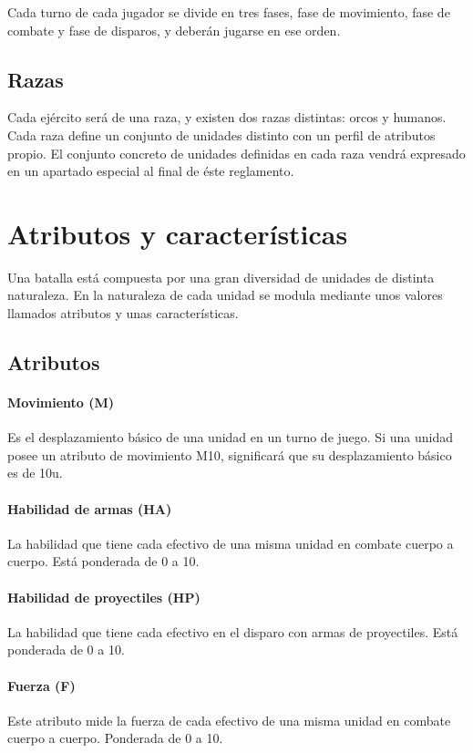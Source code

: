 Cada turno de cada jugador se divide en tres fases, fase de
movimiento, fase de combate y fase de disparos, y deberán jugarse en ese orden. 

\subsection*{Razas}
Cada ejército será de una raza, y existen dos razas distintas: orcos y
humanos. Cada raza define un conjunto de unidades distinto con un
perfil de atributos propio. El conjunto concreto de unidades definidas
en cada raza vendrá expresado en un apartado especial al final de éste
reglamento.


\section*{Atributos y características}
\label{atributos}
Una batalla está compuesta por una gran diversidad de unidades de distinta naturaleza. En \GoM la naturaleza de cada unidad se modula mediante unos valores llamados atributos y unas características. 

\subsection*{Atributos}
\paragraph{Movimiento (M)}
Es el desplazamiento básico de una unidad en un turno de juego. Si una unidad posee un atributo de movimiento M10, significará que su desplazamiento básico es de 10u.

\paragraph{Habilidad de armas (HA)}
La habilidad que tiene cada efectivo de una misma unidad en combate
cuerpo a cuerpo. Está ponderada de 0 a 10. 

\paragraph{Habilidad de proyectiles (HP)}
La habilidad que tiene cada efectivo en el disparo con armas de proyectiles. Está ponderada de 0 a 10. 

\paragraph{Fuerza (F)}
Este atributo mide la fuerza de cada efectivo de una misma unidad en combate cuerpo a cuerpo. Ponderada de 0 a 10.

